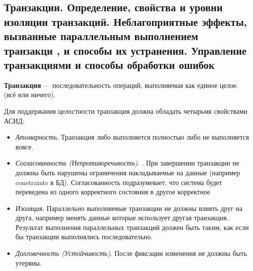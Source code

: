 \newpage

\subsection{Транзакции. Определение, свойства и уровни изоляции транзакций. Неблагоприятные эффекты, вызванные параллельным выполнением транзакци , и способы их устранения. Управление транзакциями и способы обработки ошибок}

\textbf{Транзакция} --- последовательность операций, выполняемая как единое целое. (всё или ничего).

Для поддержания целостности транзакция должна обладать четырьмя свойствами АСИД:
\begin{itemize}
	\item \textit{Атомарность}. Транзакция либо выполняется полностью либо не выполняется вовсе.
	\item \textit{Согласованность (Непротиворечивость)}. . При завершении транзакции не должны быть нарушены ограничения накладываемые на данные (например constraints в БД). Согласованность подразумевает, что система будет переведена из одного корректного состояния в другое корректное
	\item \textit{Изоляция}. Параллельно выполняемые транзакции не должны влиять друг на друга,
	например менять данные которые использует другая транзакция. Результат выполнения параллельных транзакций должен быть таким, как если бы транзакции выполнялись последовательно.
	\item \textit{Долговечность (Устойчивость)}. После фиксации изменения не должны быть утеряны.
\end{itemize}


